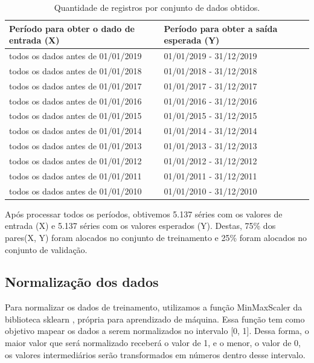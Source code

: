 \begin{table}[H]
\centering
\caption{Quantidade de registros por conjunto de dados obtidos.}
\label{tab:dados_de_treinament_lstm}
\begin{adjustbox}{width=\textwidth}
\begin{tabular}{|l|l|}
\hline
\textbf{Período para obter o dado de entrada (X)} & \textbf{Período para obter a saída esperada (Y)}\\
\hline
todos os dados antes de 01/01/2019  & 01/01/2019 - 31/12/2019 \\
\hline
todos os dados antes de 01/01/2018  & 01/01/2018 - 31/12/2018 \\
\hline
todos os dados antes de 01/01/2017  & 01/01/2017 - 31/12/2017 \\
\hline
todos os dados antes de 01/01/2016  & 01/01/2016 - 31/12/2016 \\
\hline
todos os dados antes de 01/01/2015  & 01/01/2015 - 31/12/2015 \\
\hline
todos os dados antes de 01/01/2014  & 01/01/2014 - 31/12/2014 \\
\hline
todos os dados antes de 01/01/2013  & 01/01/2013 - 31/12/2013 \\
\hline
todos os dados antes de 01/01/2012  & 01/01/2012 - 31/12/2012 \\
\hline
todos os dados antes de 01/01/2011  & 01/01/2011 - 31/12/2011 \\
\hline
todos os dados antes de 01/01/2010  & 01/01/2010 - 31/12/2010 \\
\hline
\end{tabular}
\end{adjustbox}
\end{table}

Após processar todos os períodos, obtivemos 5.137 séries com os valores de entrada (X) e 5.137 séries com os valores esperados (Y). Destas, 75\% dos pares(X, Y) foram alocados no conjunto de treinamento e 25\% foram alocados no conjunto de validação.  


\subsection{Normalização dos dados}

Para normalizar os dados de treinamento, utilizamos a função MinMaxScaler da biblioteca sklearn \cite{pedregosa2011scikit}, própria para aprendizado de máquina. Essa função tem como objetivo mapear os dados a serem normalizados no intervalo [0, 1]. Dessa forma, o maior valor que será normalizado receberá o valor de 1, e o menor, o valor de 0, os valores intermediários serão transformados em números dentro desse intervalo.

